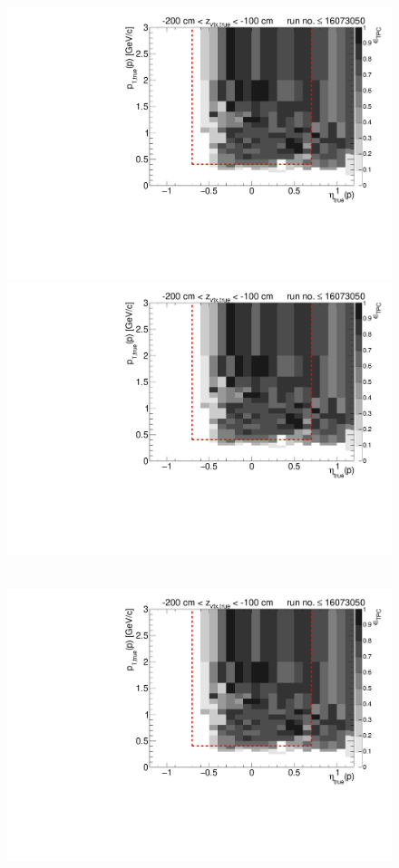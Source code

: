 \begin{figure}[hb]
{  \includegraphics[width=\linewidth,page=7]{graphics/eff/Eff2D_TPC_proton_Minus_RunRange1.pdf}\\
  \includegraphics[width=\linewidth,page=9]{graphics/eff/Eff2D_TPC_proton_Minus_RunRange1.pdf}
}~
\parbox{0.495\textwidth}{
  \centering
  \includegraphics[width=\linewidth,page=4]{graphics/eff/Eff2D_TPC_proton_Minus_RunRange1.pdf}\\
}
\end{figure}
